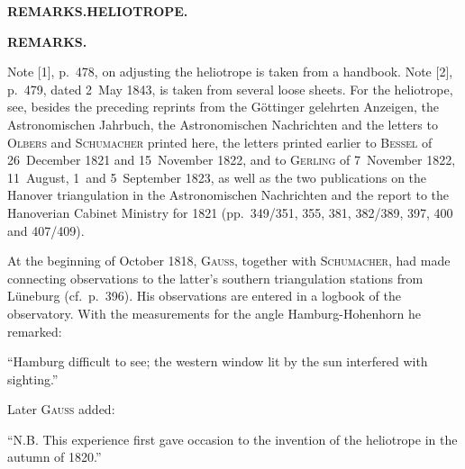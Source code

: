 \clearpage
\noindent\null\hfill{\small\textbf{REMARKS.\quad HELIOTROPE.}}\hfill{}\par
\vspace*{28mm}
\begin{center}\textbf{REMARKS.}\end{center}
\begingroup\small
Note [1], p.~478, on adjusting the heliotrope is taken from a handbook. Note
[2], p.~479, dated 2~May 1843, is taken from several loose sheets. For the
heliotrope, see, besides the preceding reprints from the Göttinger gelehrten Anzeigen, the Astronomischen Jahrbuch,
the Astronomischen Nachrichten and the letters to \textsc{Olbers} and \textsc{Schumacher} printed here, the letters
printed earlier to \textsc{Bessel} of 26~December 1821 and 15~November 1822,
and to \textsc{Gerling} of 7~November 1822, 11~August, 1~and 5~September 1823, as well as the two publications
on the Hanover triangulation in the Astronomischen Nachrichten and the report to the Hanoverian Cabinet
Ministry for 1821 (pp.~349/351, 355, 381, 382/389, 397, 400 and 407/409).

At the beginning of October 1818, \textsc{Gauss}, together with \textsc{Schumacher}, had made connecting observations
to the latter's southern triangulation stations from Lüneburg (cf.\ p.~396). His observations
are entered in a logbook of the observatory. With the measurements for the angle Hamburg-Hohenhorn he remarked:

``Hamburg difficult to see; the western window lit by the sun interfered with sighting.''

Later \textsc{Gauss} added:

``N.B. This experience first gave occasion to the invention of the heliotrope in the autumn of 1820.''

